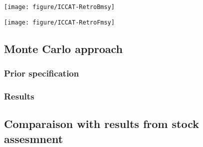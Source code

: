 {\centering \texttt{[image: figure/ICCAT-RetroBmsy]} 

}



{\centering \texttt{[image: figure/ICCAT-RetroFmsy]} 

}

\subsection{Monte Carlo approach}
\subsubsection{Prior specification}
\subsubsection{Results}

\subsection{Comparaison with results from stock assesmnent}

